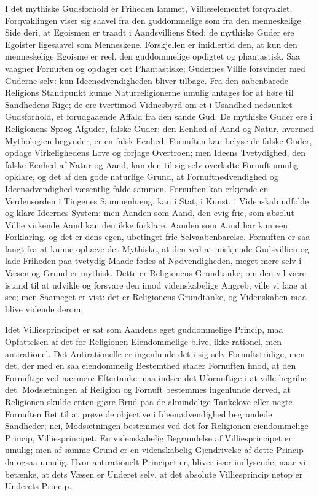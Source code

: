 \documentclass[12pt]{book}
\begin{document}
I det mythiske Gudsforhold er Friheden lammet, Villieselementet
forqvaklet. Forqvaklingen viser sig saavel fra den guddommelige som
fra den menneskelige Side deri, at Egoismen er traadt i
Aandsvilliens Sted;
de mythiske Guder ere Egoister ligesaavel som Menneskene.
Forskjellen er imidlertid den, at kun den menneskelige Egoisme er
reel, den guddommelige opdigtet og phantastisk. Saa vaagner
Fornuften og opdager det Phantastiske; Gudernes Villie forsvinder
med Guderne selv: kun Ideenødvendigheden bliver tilbage. Fra den
aabenbarede Religions Standpunkt kunne Naturreligionerne umulig
antages for at høre til Sandhedens Rige; de ere tvertimod Vidnesbyrd
om et i Usandhed nedsunket Gudsforhold, et forudgaaende Affald fra
den sande Gud. De mythiske Guder ere i Religionens Sprog Afguder,
falske Guder; den Eenhed af Aand og Natur, hvormed Mythologien
begynder, er en falsk Eenhed. Fornuften kan belyse de falske Guder,
opdage Virkelighedens Love og forjage Overtroen; men Ideens
Tvetydighed, den falske Eenhed af Natur og Aand, kan den til sig
selv overladte Fornuft umulig opklare, og det af den gode naturlige
Grund, at Fornuftnødvendighed og Ideenødvendighed væsentlig falde
sammen. Fornuften kan erkjende en Verdensorden i Tingenes
Sammenhæng, kan i Stat, i Kunst, i Videnskab udfolde og klare
Ideernes System; men Aanden som Aand, den evig frie, som absolut
Villie virkende Aand kan den ikke forklare. Aanden som Aand har kun
een Forklaring, og det er dens egen, ubetinget frie
Selvaabenbarelse. Fornuften er saa langt fra at kunne ophæve det
Mythiske, at den ved at miskjende Gudsvillien og lade Friheden paa
tvetydig Maade fødes af Nødvendigheden, meget mere selv i Væsen og
Grund er mythisk. Dette er Religionens Grundtanke; om den vil være
istand til at udvikle og forsvare den imod videnskabelige Angreb,
ville vi faae at see; men Saameget er vist: det er Religionens
Grundtanke, og Videnskaben maa blive vidende derom.

Idet Villiesprincipet er sat som Aandens eget guddommelige Princip,
maa Opfattelsen af det for Religionen
Eiendommelige blive, ikke rationel, men antirationel. Det
Antirationelle er ingenlunde det i sig selv Fornuftstridige, men
det, der med en saa eiendommelig Bestemthed staaer Fornuften imod,
at den Fornuftige ved nærmere Eftertanke maa indsee det Ufornuftige
i at ville begribe det. Modsætningen af Religion og Fornuft
bestemmes ingenlunde derved, at Religionen skulde enten gjøre Brud
paa de almindelige Tankelove eller negte Fornuften Ret til at prøve
de objective i Ideenødvendighed begrundede Sandheder; nei,
Modsætningen bestemmes ved det for Religionen eiendommelige Princip,
Villiesprincipet. En videnskabelig Begrundelse af Villiesprincipet
er umulig; men af samme Grund er en videnskabelig Gjendrivelse af
dette Princip da ogsaa umulig. Hvor antirationelt Principet er,
bliver især indlysende, naar vi betænke, at dets Væsen er Underet
selv, at det absolute Villiesprincip netop er Underets Princip.
\end{document}
